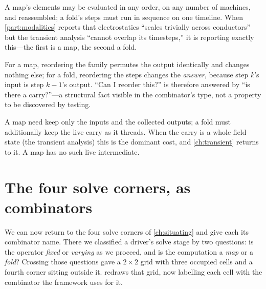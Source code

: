 \begin{description}[style=nextline, leftmargin=0pt, font=\normalfont\itshape]
  \item[Parallelism follows the carry.] A map's elements may be evaluated in any
  order, on any number of machines, and reassembled; a fold's steps must run in
  sequence on one timeline. When \cref{part:modalities} reports that electrostatics
  ``scales trivially across conductors'' but the transient analysis ``cannot
  overlap its timesteps,'' it is reporting exactly this---the first is a map, the
  second a fold.
  \item[Reordering is a correctness question, not a performance one.] For a map,
  reordering the family permutes the output identically and changes nothing else;
  for a fold, reordering the steps changes the \emph{answer}, because step $k$'s
  input is step $k{-}1$'s output. ``Can I reorder this?'' is therefore answered by
  ``is there a carry?''---a structural fact visible in the combinator's type, not a
  property to be discovered by testing.
  \item[Memory follows the carry too.] A map need keep only the inputs and the
  collected outputs; a fold must additionally keep the live carry as it threads.
  When the carry is a whole field state (the transient analysis) this is the
  dominant cost, and \cref{ch:transient} returns to it. A map has no such live
  intermediate.
\end{description}

\section{The four solve corners, as combinators}
\label{sec:corners}

We can now return to the four solve corners of \cref{ch:situating} and give each
its combinator name. There we classified a driver's solve stage by two questions:
is the operator \emph{fixed} or \emph{varying} as we proceed, and is the
computation a \emph{map} or a \emph{fold}? Crossing those questions gave a
$2\times2$ grid with three occupied cells and a fourth corner sitting outside it.
 redraws that grid, now labelling each cell with the
combinator the framework uses for it.

